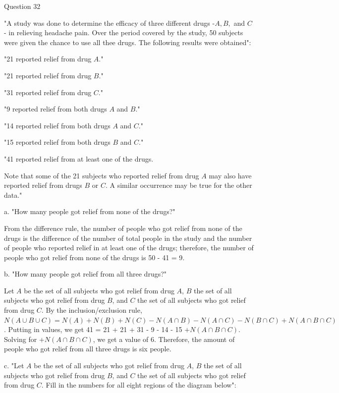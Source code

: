 \documentclass{article}
\begin{document}
\clearpage
{} Question 32
\item[]"A study was done to determine the efficacy of three different drugs -$A, B,$ and $C$- in relieving headache pain. Over the period covered by the study, 50 subjects were given the chance to use all thee drugs. The following results were obtained":
\item[]"21 reported relief from drug $A$."
\item[]"21 reported relief from drug $B$."
\item[]"31 reported relief from drug $C$."
\item[]"9 reported relief from both drugs $A$ and $B$."
\item[]"14 reported relief from both drugs $A$ and $C$."
\item[]"15 reported relief from both drugs $B$ and $C$."
\item[]"41 reported relief from at least one of the drugs.
\item[]Note that some of the 21 subjects who reported relief from drug $A$ may also have reported relief from drugs $B$ or $C$. A similar occurrence may be true for the other data."
\item[]a. "How many people got relief from none of the drugs?"

From the difference rule, the number of people who got relief from none of the drugs is the difference of the number of total people in the study and the number of people who reported relief in at least one of the drugs; therefore, the number of people who got relief from none of the drugs is 50 - 41 = 9.

\item[]b. "How many people got relief from all three drugs?"

Let $A$ be the set of all subjects who got relief from drug $A$, $B$ the set of all subjects  who got relief from drug $B$, and $C$ the set of all subjects  who got relief from drug $C$. By the inclusion/exclusion rule, $N(A \cup B \cup C) = N(A) + N(B) + N(C) - N(A \cap B) - N(A \cap C) - N(B \cap C) + N(A \cap B \cap C)$ . Putting in values, we get 41 = 21 + 21 + 31 - 9 - 14 - 15  $+ N(A \cap B \cap C)$. Solving for $+ N(A \cap B \cap C)$, we get a value of 6. Therefore, the amount of people who got relief from all three drugs is six people. 

\clearpage
\header
\item[]c. "Let $A$ be the set of all subjects who got relief from drug $A$, $B$ the set of all subjects  who got relief from drug $B$, and $C$ the set of all subjects  who got relief from drug $C$. Fill in the numbers for all eight regions of the diagram below":
\end{document}
